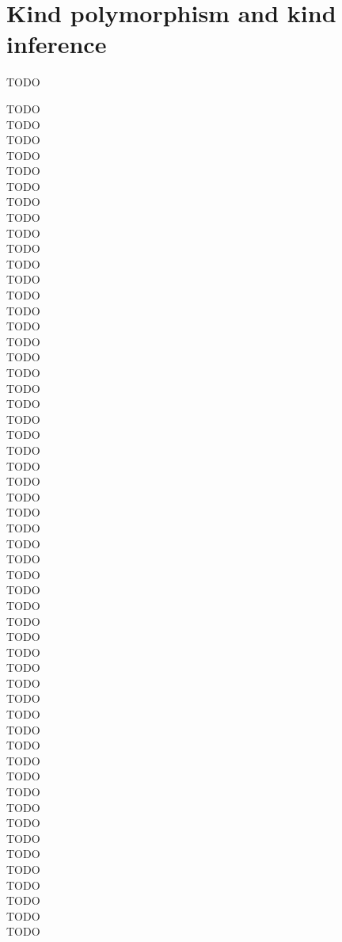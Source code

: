 \section{Kind polymorphism and kind inference}\label{sec:futwork:kindpoly}
TODO


TODO \\ TODO \\ TODO \\ TODO \\ TODO \\ TODO \\ TODO \\ TODO \\ TODO \\ 
TODO \\ TODO \\ TODO \\ TODO \\ TODO \\ TODO \\ TODO \\ TODO \\ TODO \\ 
TODO \\ TODO \\ TODO \\ TODO \\ TODO \\ TODO \\ TODO \\ TODO \\ TODO \\ 
TODO \\ TODO \\ TODO \\ TODO \\ TODO \\ TODO \\ TODO \\ TODO \\ TODO \\ 
TODO \\ TODO \\ TODO \\ TODO \\ TODO \\ TODO \\ TODO \\ TODO \\ TODO \\ 
TODO \\ TODO \\ TODO \\ TODO \\ TODO \\ TODO \\ TODO \\ TODO \\ TODO \\ 



